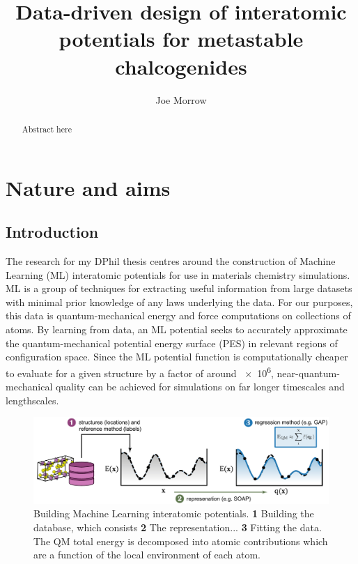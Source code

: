 \documentclass[12pt,a4paper,twoside,nobind]{ociamthesis}
\title{Data-driven design of interatomic potentials for metastable chalcogenides}
\author{Joe Morrow}
\begin{document}
\setlength{\textbaselineskip}{26pt}
\setlength{\frontmatterbaselineskip}{17pt plus1pt minus1pt}
\setlength{\baselineskip}{\textbaselineskip}
\setlength{\baselineskip}{\singlebaselineskip}
%
\setcounter{secnumdepth}{2}
\setcounter{tocdepth}{2}
%
\begin{romanpages}
%
\maketitle
%
%     
%
\begin{abstract}
  Abstract here
\end{abstract}
%
\flushbottom
\tableofcontents
%
%
% 
%
\end{romanpages}
%
\chapter{Nature and aims} \label{chap:introduction}
%
%
\section{Introduction}
The research for my DPhil thesis centres around the construction of Machine Learning (ML) interatomic potentials
for use in materials chemistry simulations. ML is a group of techniques for extracting useful information from large datasets
with minimal prior knowledge of any laws underlying the data. 
For our purposes, this data is quantum-mechanical energy and force computations on collections of atoms.
By learning from data, 
an ML potential seeks to accurately approximate the quantum-mechanical potential energy surface (PES) in relevant regions of configuration space.
Since the ML potential function is computationally cheaper to evaluate for a given structure by a factor of around \num{e6},
 near-quantum-mechanical quality can be achieved for simulations on far longer timescales and lengthscales.

 \begin{figure}[ht]
  \includegraphics[width=\linewidth]{ML_schematic.pdf}
  \caption{
  Building Machine Learning interatomic potentials. \textbf{1} Building the database, which consists \textbf{2} The representation... \textbf{3} Fitting the data.
  The QM total energy is decomposed into atomic contributions which are a function of the local environment of each atom.
  }
  \label{fig:ML}
\end{figure}
\end{document}
